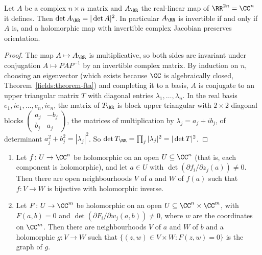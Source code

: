 \begin{lemma}\label{several-complex-variables:lemma-real-determinant}
Let $A$ be a complex $n \times n$ matrix and $A_\RR$ the real-linear map of $\RR^{2n} = \CC^n$ it defines. Then $\det A_\RR = |\det A|^2$. In particular $A_\RR$ is invertible if and only if $A$ is, and a
holomorphic map with invertible complex Jacobian preserves orientation.
\end{lemma}

\begin{proof}
The map $A \mapsto A_\RR$ is multiplicative, so both sides are invariant under conjugation $A \mapsto PAP^{-1}$ by an invertible complex matrix. By induction on $n$, choosing an eigenvector (which exists because
$\CC$ is algebraically closed, Theorem~\ref{fields:theorem-fta}) and completing it to a basis, $A$ is conjugate to an upper triangular matrix $T$ with diagonal entries $\lambda_1, \ldots, \lambda_n$. In
the real basis $e_1, ie_1, \ldots, e_n, ie_n$, the matrix of $T_\RR$ is block upper triangular with $2 \times 2$ diagonal blocks $\begin{pmatrix}a_j & -b_j\\ b_j & a_j\end{pmatrix}$, the matrices of multiplication by
$\lambda_j = a_j + ib_j$, of determinant $a_j^2 + b_j^2 = |\lambda_j|^2$. So $\det T_\RR = \prod_j|\lambda_j|^2 = |\det T|^2$.
\end{proof}

\begin{proposition}\label{several-complex-variables:proposition-inverse-function}
\begin{enumerate}
\item Let $f \colon U \to \CC^n$ be holomorphic on an open $U \subseteq \CC^n$ (that is, each component is holomorphic), and let $a \in U$ with $\det(\partial f_i/\partial z_j(a)) \neq 0$. Then there are open
neighbourhoods $V$ of $a$ and $W$ of $f(a)$ such that $f \colon V \to W$ is bijective with holomorphic inverse.
\item Let $F \colon U \to \CC^m$ be holomorphic on an open $U \subseteq \CC^n \times \CC^m$, with $F(a, b) = 0$ and $\det(\partial F_i/\partial w_j(a, b)) \neq 0$, where $w$ are the coordinates on $\CC^m$. Then there are
neighbourhoods $V$ of $a$ and $W$ of $b$ and a holomorphic $g \colon V \to W$ such that $\{(z, w) \in V \times W : F(z, w) = 0\}$ is the graph of $g$.
\end{enumerate}
\end{proposition}

